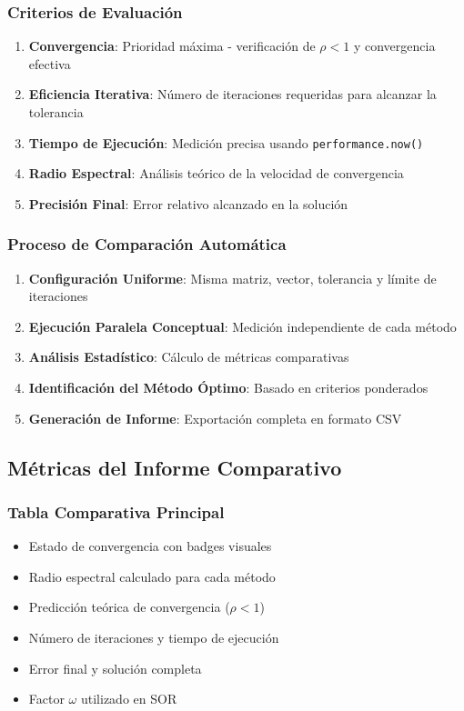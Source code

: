 \subsubsection{Criterios de Evaluación}
\begin{enumerate}
    \item \textbf{Convergencia}: Prioridad máxima - verificación de $\rho < 1$ y convergencia efectiva
    \item \textbf{Eficiencia Iterativa}: Número de iteraciones requeridas para alcanzar la tolerancia
    \item \textbf{Tiempo de Ejecución}: Medición precisa usando \texttt{performance.now()}
    \item \textbf{Radio Espectral}: Análisis teórico de la velocidad de convergencia
    \item \textbf{Precisión Final}: Error relativo alcanzado en la solución
\end{enumerate}

\subsubsection{Proceso de Comparación Automática}
\begin{enumerate}
    \item \textbf{Configuración Uniforme}: Misma matriz, vector, tolerancia y límite de iteraciones
    \item \textbf{Ejecución Paralela Conceptual}: Medición independiente de cada método
    \item \textbf{Análisis Estadístico}: Cálculo de métricas comparativas
    \item \textbf{Identificación del Método Óptimo}: Basado en criterios ponderados
    \item \textbf{Generación de Informe}: Exportación completa en formato CSV
\end{enumerate}

\subsection{Métricas del Informe Comparativo}

\subsubsection{Tabla Comparativa Principal}
\begin{itemize}
    \item Estado de convergencia con badges visuales
    \item Radio espectral calculado para cada método
    \item Predicción teórica de convergencia ($\rho < 1$)
    \item Número de iteraciones y tiempo de ejecución
    \item Error final y solución completa
    \item Factor $\omega$ utilizado en SOR
\end{itemize}

